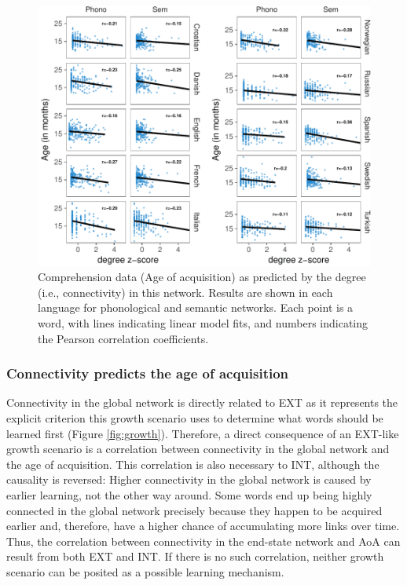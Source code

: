 \documentclass[english,floatsintext,man]{apa6}
\theoremstyle{definition}
\theoremstyle{definition}
\theoremstyle{definition}
\theoremstyle{remark}
\begin{document}
\begin{figure}[!h]
\includegraphics[width=\textwidth]{ms_files/figure-latex/corrComp-1} \caption{Comprehension data (Age of acquisition) as predicted by the degree (i.e., connectivity) in this network. Results are shown in each language for phonological and semantic networks. Each point is a word, with lines indicating linear model fits, and numbers indicating the Pearson correlation coefficients.}\label{fig:corrComp}
\end{figure}

\subsubsection{Connectivity predicts the age of
acquisition}\label{connectivity-predicts-the-age-of-acquisition}

Connectivity in the global network is directly related to EXT as it
represents the explicit criterion this growth scenario uses to determine
what words should be learned first (Figure \ref{fig:growth}). Therefore,
a direct consequence of an EXT-like growth scenario is a correlation
between connectivity in the global network and the age of acquisition.
This correlation is also necessary to INT, although the causality is
reversed: Higher connectivity in the global network is caused by earlier
learning, not the other way around. Some words end up being highly
connected in the global network precisely because they happen to be
acquired earlier and, therefore, have a higher chance of accumulating
more links over time. Thus, the correlation between connectivity in the
end-state network and AoA can result from both EXT and INT. If there is
no such correlation, neither growth scenario can be posited as a
possible learning mechanism.
\end{document}
